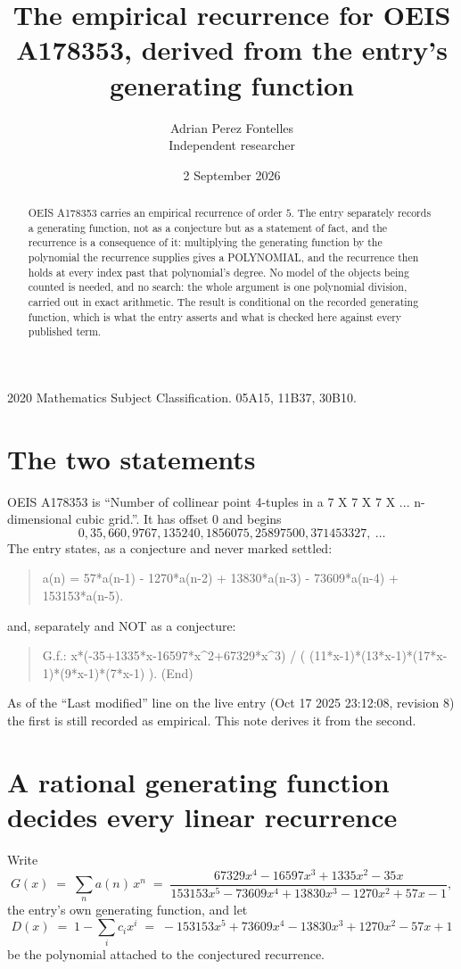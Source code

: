 \documentclass[11pt,a4paper]{article}
\title{The empirical recurrence for OEIS A178353, derived from the entry's generating function}
\author{Adrian Perez Fontelles\\ \small Independent researcher}
\date{2 September 2026}
\theoremstyle{plain}
\theoremstyle{definition}
\begin{document}
\maketitle

\begin{abstract}
OEIS A178353 carries an empirical recurrence of order $5$. The entry separately records a
generating function, not as a conjecture but as a statement of fact, and the recurrence is a
consequence of it: multiplying the generating function by the polynomial the recurrence
supplies gives a POLYNOMIAL, and the recurrence then holds at every index past that
polynomial's degree. No model of the objects being counted is needed, and no search: the
whole argument is one polynomial division, carried out in exact arithmetic. The result is
conditional on the recorded generating function, which is what the entry asserts and what is
checked here against every published term.
\end{abstract}

\noindent\small 2020 Mathematics Subject Classification. 05A15, 11B37, 30B10.\normalsize

\section{The two statements}

OEIS A178353 is ``Number of collinear point 4-tuples in a 7 X 7 X 7 X ... n-dimensional cubic grid.''. It has offset $0$ and begins
\[
0, 35, 660, 9767, 135240, 1856075, 25897500, 371453327,\ \dots
\]
The entry states, as a conjecture and never marked settled:
\begin{quote}
a(n) = 57*a(n-1) - 1270*a(n-2) + 13830*a(n-3) - 73609*a(n-4) + 153153*a(n-5).
\end{quote}
and, separately and NOT as a conjecture:
\begin{quote}
G.f.: x*(-35+1335*x-16597*x\^{}2+67329*x\^{}3) / ( (11*x-1)*(13*x-1)*(17*x-1)*(9*x-1)*(7*x-1) ). (End)
\end{quote}
As of the ``Last modified'' line on the live entry (Oct 17 2025 23:12:08, revision 8) the first is still
recorded as empirical. This note derives it from the second.

\section{A rational generating function decides every linear recurrence}

Write
\[
G(x)\;=\;\sum_{n}a(n)\,x^{n}\;=\;\frac{67329 x^{4} - 16597 x^{3} + 1335 x^{2} - 35 x}{153153 x^{5} - 73609 x^{4} + 13830 x^{3} - 1270 x^{2} + 57 x - 1},
\]
the entry's own generating function, and let
\[
D(x)\;=\;1-\sum_i c_i x^{i}\;=\;- 153153 x^{5} + 73609 x^{4} - 13830 x^{3} + 1270 x^{2} - 57 x + 1
\]
be the polynomial attached to the conjectured recurrence.
\end{document}

